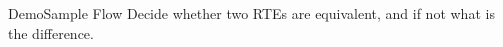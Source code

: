 \begin{frame}{Demo}{Sample Flow}
  Decide whether two RTEs are equivalent, and if not what is the difference.
\end{frame}
